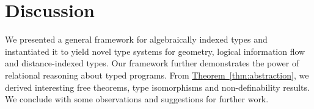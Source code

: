 \documentclass{sigplanconf}
\newcommand{\tyPrim}[2]{\textup{\texttt{#1}}\langle #2 \rangle}
\newcommand{\tyPrimNm}[1]{\textup{\texttt{#1}}}
\newcommand{\thmref}[1]{\hyperref[#1]{Theorem~\ref*{#1}}}
\theoremstyle{examplestyle}
\newtheorem{example}{Example}
\theoremstyle{restatementstyle}
\begin{document}











\section{Discussion}
\label{sec:discussion}

We presented a general framework for algebraically indexed types and
instantiated it to yield novel type systems for geometry, logical
information flow and distance-indexed types. Our framework further
demonstrates the power of relational reasoning about typed
programs. From \thmref{thm:abstraction}, we derived interesting free
theorems, type isomorphisms and non-definability results. We conclude
with some observations and suggestions for further work.
\end{document}
